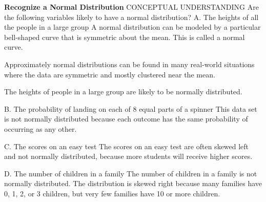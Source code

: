 \documentclass{article}
\newenvironment{example}[1]{}{}         %
\newcommand{\answer}[1]{}               %
\newcommand{\placeholder}[2]{}          %
\newcommand{\te}[1]{}                   %
\begin{document}
\begin{example}{3}
\textbf{Recognize a Normal Distribution}
CONCEPTUAL UNDERSTANDING
Are the following variables likely to have a normal distribution?
A. The heights of all the people in a large group
A normal distribution can be modeled by a particular bell-shaped curve that is symmetric about the mean. This is called a normal curve.
\placeholder{graph}{Blue symmetric normal curve with a dashed vertical centerline labeled Mean, Median, Mode. Horizontal axis has arrows both ends and two unlabeled ticks equidistant from the center. Red horizontal double arrow from center to right tick is labeled standard deviation.}
Approximately normal distributions can be found in many real-world situations where the data are symmetric and mostly clustered near the mean.
\placeholder{graph}{Blue narrow-bin height histogram overlaid by a red normal curve. Horizontal Height (in.) labels 55,60,65,70,75,80. Vertical Proportion labels 0,.05,.1,.15,.2. Histogram peaks near 68 inches at about .18, with small tails near 58 and 78; red curve peaks near 68 at about .16. No arrows.}
The heights of people in a large group are likely to be normally distributed.
\answer{A. likely to be normally distributed.}
\te{STUDY TIP Notice that for real-world examples, the data in a normal distribution might not be perfectly normally distributed but can be modeled by a normal curve.}
B. The probability of landing on each of 8 equal parts of a spinner
This data set is not normally distributed because each outcome has the same probability of occurring as any other.
\placeholder{graph}{Blue separated bars for Spinner outcomes 1 through 8. Vertical Frequency 0 to 20, labels every 5. Bar heights 16,13,7,16,9,13,19,11. No axis arrows.}
\answer{B. not normally distributed.}
\te{Printed graph shows observed frequencies of unequal heights, while the text describes equal theoretical probabilities.}
C. The scores on an easy test
The scores on an easy test are often skewed left and not normally distributed, because more students will receive higher scores.
\placeholder{graph}{Blue histogram with horizontal Test Scores intervals 51-55,56-60,61-65,66-70,71-75,76-80,81-85,86-90,91-95,96-100. Vertical Frequency 0 to 10, labels every 2. Contiguous bar heights 1,1,2,3,6,5,9,8,5,2. No arrows.}
\answer{C. often skewed left and not normally distributed.}
D. The number of children in a family
The number of children in a family is not normally distributed. The distribution is skewed right because many families have 0, 1, 2, or 3 children, but very few families have 10 or more children.
\placeholder{graph}{Blue histogram, horizontal Number of Children with labels 0,1,2,3,4,5,6,7,8,9,10+. Vertical Frequency has no numerical ticks. Bar for 0 is highest; 1 is about one third as tall; subsequent bars decrease toward almost zero at 10+. No arrows.}
\answer{D. not normally distributed; skewed right.}
\end{example}
\end{document}
